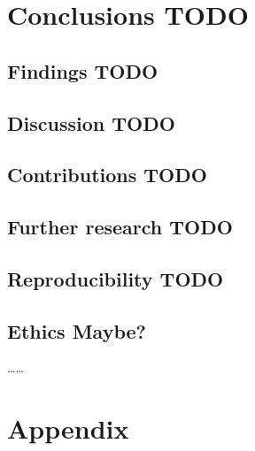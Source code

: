 \documentclass[a4paper, 12pt]{report}
\def\comment#1{\color{red}#1\color{black}}
\begin{document}
\chapter{Conclusions \comment{TODO}}

\section{Findings \comment{TODO}}
\section{Discussion \comment{TODO}}

\newpage
\section{Contributions \comment{TODO}}
\section{Further research \comment{TODO}}

\section{Reproducibility \comment{TODO}}
\section{Ethics \comment{Maybe?}}
\comment{\ldots\ldots}


{\footnotesize }

\newpage
\chapter{Appendix}
\end{document}
